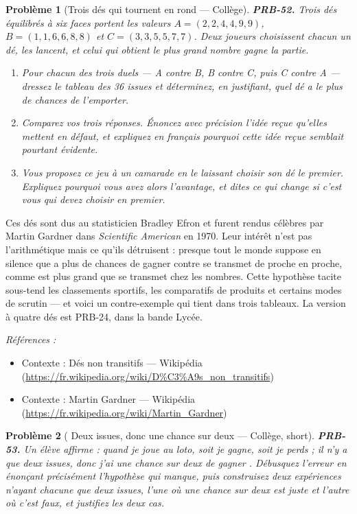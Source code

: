 \documentclass[11pt]{article}
\newtheorem{problem}{Problème}
\newenvironment{refs}{\par\small\noindent\emph{Références :}\begin{itemize}\setlength\itemsep{0pt}}{\end{itemize}\normalsize}
\begin{document}
\bigskip

\begin{problem}[{Trois dés qui tournent en rond --- Collège}]
\textbf{PRB-52.} Trois dés équilibrés à six faces portent les valeurs
$ A = (2,2,4,4,9,9) $, $ B = (1,1,6,6,8,8) $ et $ C = (3,3,5,5,7,7) $. Deux joueurs choisissent
chacun un dé, les lancent, et celui qui obtient le plus grand nombre gagne la partie.
\begin{enumerate}
\item[(a)] Pour chacun des trois duels --- A contre B, B contre C, puis C contre A --- dressez le tableau des
36 issues et déterminez, en justifiant, quel dé a le plus de chances de l'emporter.
\item[(b)] Comparez vos trois réponses. Énoncez avec précision l'idée reçue qu'elles mettent en défaut,
et expliquez en français pourquoi cette idée reçue semblait pourtant évidente.
\item[(c)] Vous proposez ce jeu à un camarade en le laissant choisir son dé le premier. Expliquez
pourquoi vous avez alors l'avantage, et dites ce qui change si c'est vous qui devez choisir en
premier.
\end{enumerate}

\end{problem}

\noindent Ces dés sont dus au statisticien Bradley Efron et furent rendus célèbres par
Martin Gardner dans \textit{Scientific American} en 1970. Leur intérêt n'est pas l'arithmétique mais
ce qu'ils détruisent : presque tout le monde suppose en silence que \og{} a plus de chances de gagner
contre \fg{} se transmet de proche en proche, comme \og{} est plus grand que \fg{} se transmet chez les
nombres. Cette hypothèse tacite sous-tend les classements sportifs, les comparatifs de produits et
certains modes de scrutin --- et voici un contre-exemple qui tient dans trois tableaux. La version à
quatre dés est PRB-24, dans la bande Lycée.

\begin{refs}
\item Contexte : Dés non transitifs --- Wikipédia (\url{https://fr.wikipedia.org/wiki/D%C3%A9s_non_transitifs})
\item Contexte : Martin Gardner --- Wikipédia (\url{https://fr.wikipedia.org/wiki/Martin_Gardner})
\end{refs}

\bigskip

\begin{problem}[{\og{} Deux issues, donc une chance sur deux \fg{} --- Collège, short}]
\textbf{PRB-53.} Un élève affirme : \og{} quand je joue au loto, soit je gagne,
soit je perds ; il n'y a que deux issues, donc j'ai une chance sur deux de gagner \fg{}. Débusquez
l'erreur en énonçant précisément l'hypothèse qui manque, puis construisez deux expériences n'ayant
chacune que deux issues, l'une où \og{} une chance sur deux \fg{} est juste et l'autre où c'est faux, et
justifiez les deux cas.
\end{problem}
\end{document}

